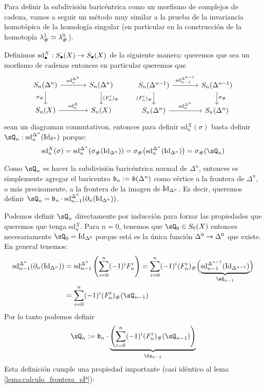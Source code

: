 \documentclass[../../topologia_algebraica]{subfiles}
\begin{document}
Para definir la subdivisi\'on baric\'entrica como un morfismo de complejos de cadena,
vamos a seguir un m\'etodo muy similar a la prueba de la invariancia homot\'opica de
la homolog\'ia singular (en particular en la construcci\'on de la homotop\'ia
$\lambda^1_{\#}\simeq\lambda^0_{\#}$).

Definimos $\text{sd}_{\bullet}^X:S_{\bullet}(X)\rightarrow S_{\bullet}(X)$ de la siguiente manera:
queremos que sea un morfismo de cadenas entonces en particular queremos que
\begin{equation}\label{eq:diagramas_subdivision_baricentrica}
  \begin{tikzcd}[column sep=large]
    S_n(\Delta^n) \arrow[r,"\text{sd}_n^{\Delta^n}"] \arrow[d,"\sigma_{\#}"'] &
    S_n(\Delta^n) \arrow[d,"(F^i_n)_{\#}"] \\
    S_n(X) \arrow[r,"\text{sd}_n^X"] & S_n(X)
  \end{tikzcd}\qquad
  \begin{tikzcd}[column sep=large]
    S_n(\Delta^{n-1}) \arrow[r,"\text{sd}_{n-1}^{\Delta^{n-1}}"] \arrow[d,"(F^i_n)_{\#}"'] &
    S_n(\Delta^{n-1}) \arrow[d,"\sigma_{\#}"] \\
    S_n(\Delta^n) \arrow[r,"\text{sd}_n^{\Delta^n}"] & S_n(\Delta^n)
  \end{tikzcd}
\end{equation}
sean un diagraman conmutativon, entonces para definir sd${}_n^X(\sigma)$ basta definir
$\sQ_n:\text{sd}_n^{\Delta^n}(\Id_{\delta^n})$ porque:
\[
  \text{sd}_n^X(\sigma)=\text{sd}_n^{\Delta^n}(\sigma_{\#}(\Id_{\Delta^n}))=
  \sigma_{\#}\big(\text{sd}_n^{\Delta^n}(\Id_{\Delta^n}) \big)=\sigma_{\#}(\sQ_n)
\]

Como $\sQ_n$ es hacer la subdivisi\'on baric\'entrica normal de $\Delta^n$, entonces
es simplemente agregar el baricentro $\mathfrak{b}_n:=\mathfrak{b}(\Delta^n)$ como v\'ertice a la frontera
de $\Delta^n$, o m\'as precisamente, a la frontera de la imagen de $\text{Id}_{\Delta^n}$. Es
decir, queremos definir $\sQ_n=\fb_n\cdot\text{sd}_{n-1}^{\Delta^n}(\partial_n(\Id_{\Delta^n}))$.

Podemos definir $\sQ_n$ directamente por inducci\'on para forzar las propiedades que queremos
que tenga sd${}_n^X$. Para $n=0$, tenemos que $\sQ_0\in S_0(X)$ entonces necesariamente
$\sQ_0=\Id_{\Delta^0}$ porque est\'a es la \'unica funci\'on $\Delta^0\rightarrow\Delta^0$ que existe.
En general tenemos:
\begin{align*}
  \text{sd}_{n-1}^{\Delta^n}(\partial_n(\Id_{\Delta^n})) & =
  \text{sd}_{n-1}^{\Delta^n}\paren{\sum_{i=0}^n(-1)^i F_n^i}=
  \sum_{i=0}^n(-1)^i(F^i_n)_{\#}
  \Big(\underset{\sQ_{n-1}}{\underbrace{\text{sd}_{n-1}^{\Delta^{n-1}}(\Id_{\Delta^{n-1}})}}\Big) \\ & =
  \sum_{i=0}^n(-1)^i(F^i_n)_{\#}(\sQ_{n-1})
\end{align*}
Por lo tanto podemos definir
\[
  \sQ_n:=\fb_n\cdot\underset{\fz_{n-1}}%
    {\underbrace{\paren{\sum_{i=0}^n(-1)^i(F^i_n)_{\#}(\sQ_{n-1})}}}
\]
Esta definici\'on cumple una propiedad importante (casi id\'entico al lema
\ref{lema:calculo_frontera_sP}):
\end{document}
